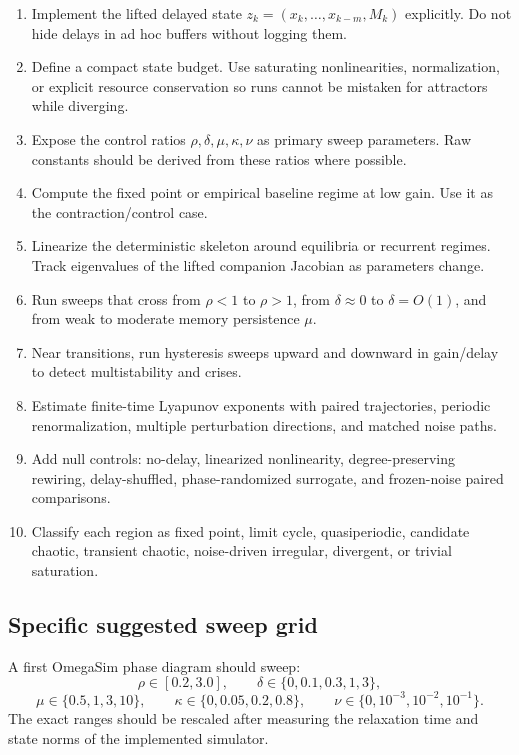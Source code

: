 \documentclass[11pt]{article}
\begin{document}
\begin{enumerate}
  \item Implement the lifted delayed state $z_k=(x_k,\ldots,x_{k-m},M_k)$
        explicitly.  Do not hide delays in ad hoc buffers without logging them.
  \item Define a compact state budget.  Use saturating nonlinearities,
        normalization, or explicit resource conservation so runs cannot be
        mistaken for attractors while diverging.
  \item Expose the control ratios $\rho,\delta,\mu,\kappa,\nu$ as primary sweep
        parameters.  Raw constants should be derived from these ratios where
        possible.
  \item Compute the fixed point or empirical baseline regime at low gain.  Use it
        as the contraction/control case.
  \item Linearize the deterministic skeleton around equilibria or recurrent
        regimes.  Track eigenvalues of the lifted companion Jacobian as parameters
        change.
  \item Run sweeps that cross from $\rho<1$ to $\rho>1$, from $\delta\approx0$ to
        $\delta=O(1)$, and from weak to moderate memory persistence $\mu$.
  \item Near transitions, run hysteresis sweeps upward and downward in gain/delay
        to detect multistability and crises.
  \item Estimate finite-time Lyapunov exponents with paired trajectories, periodic
        renormalization, multiple perturbation directions, and matched noise
        paths.
  \item Add null controls: no-delay, linearized nonlinearity, degree-preserving
        rewiring, delay-shuffled, phase-randomized surrogate, and frozen-noise
        paired comparisons.
  \item Classify each region as fixed point, limit cycle, quasiperiodic,
        candidate chaotic, transient chaotic, noise-driven irregular, divergent,
        or trivial saturation.
\end{enumerate}

\subsection{Specific suggested sweep grid}

A first OmegaSim phase diagram should sweep:
\[
  \rho\in[0.2,3.0],\qquad
  \delta\in\{0,0.1,0.3,1,3\},
\]
\[
  \mu\in\{0.5,1,3,10\},\qquad
  \kappa\in\{0,0.05,0.2,0.8\},
  \qquad
  \nu\in\{0,10^{-3},10^{-2},10^{-1}\}.
\]
The exact ranges should be rescaled after measuring the relaxation time and
state norms of the implemented simulator.
\end{document}
